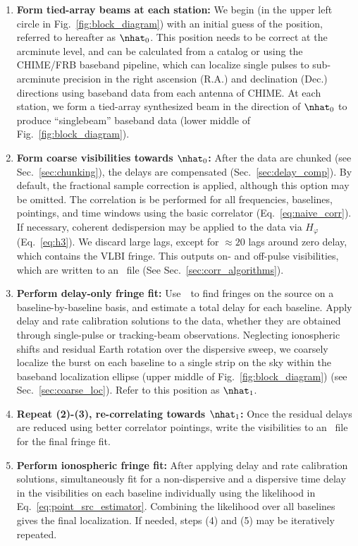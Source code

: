 \begin{enumerate}
    \item \textbf{Form tied-array beams at each station:} We begin (in the upper left circle in Fig.~\ref{fig:block_diagram}) with an initial guess of the position, referred to hereafter as $\nhat_0$. This position needs to be correct at the arcminute level, and can be calculated from a catalog or using the CHIME/FRB baseband pipeline, which can localize single pulses to sub-arcminute precision in the right ascension (R.A.) and declination (Dec.) directions using baseband data from each antenna of CHIME. At each station, we form a tied-array synthesized beam in the direction of $\nhat_0$ to produce ``singlebeam'' baseband data (lower middle of Fig.~\ref{fig:block_diagram}).
    \item \textbf{Form coarse visibilities towards $\nhat_0$:} After the data are chunked (see Sec.~\ref{sec:chunking}), the delays are compensated (Sec.~\ref{sec:delay_comp}). By default, the fractional sample correction is applied, although this option may be omitted. The correlation is be performed for all frequencies, baselines, pointings, and time windows using the basic correlator (Eq.~\ref{eq:naive_corr}). If necessary, coherent dedispersion may be applied to the data via
        $H_\varphi$ (Eq.~\ref{eq:h3}). We discard large lags, except for $\approx 20$ lags around zero delay, which contains the VLBI fringe. This outputs on- and off-pulse visibilities, which are written to an \hdf~file (See Sec.~\ref{sec:corr_algorithms}).
    \item \textbf{Perform delay-only fringe fit:} Use~\coda~to find fringes on the source on a baseline-by-baseline basis, and estimate a total delay for each baseline. Apply delay and rate calibration solutions to the data, whether they are obtained through single-pulse or tracking-beam observations. Neglecting ionospheric shifts and residual Earth rotation over the dispersive sweep, we coarsely localize the burst on each baseline to a single strip on the sky within the baseband localization ellipse (upper middle of Fig.~\ref{fig:block_diagram}) (see Sec.~\ref{sec:coarse_loc}). Refer to this position as $\nhat_1$. 
    \item \textbf{Repeat (2)-(3), re-correlating towards $\nhat_1$:} Once the residual delays are reduced using better correlator pointings, write the visibilities to an \hdf~file for the final fringe fit.
    \item \textbf{Perform ionospheric fringe fit:} After applying delay and rate calibration solutions, simultaneously fit for a non-dispersive and a dispersive time delay in the visibilities on each baseline individually using the likelihood in Eq.~\ref{eq:point_src_estimator}. Combining the likelihood over all baselines gives the final localization. If needed, steps (4) and (5) may be iteratively repeated.
\end{enumerate}

